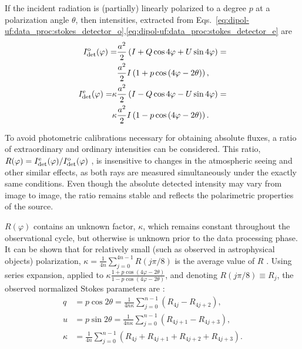 If the incident radiation is (partially) linearly polarized to a degree $p$ at a polarization angle $\theta$, then intensities, extracted from Eqs.~\ref{eq:dipol-uf:data_proc:stokes_detector_o},\ref{eq:dipol-uf:data_proc:stokes_detector_e} are
\begin{equation}
    \begin{aligned}
        \begin{aligned}
            I_{\mathrm{det}}^{\mathrm{o}}(\varphi) =& \frac{a^2}{2}\left(I + Q\cos4\varphi + U\sin4\varphi\right) = \\
            &\frac{a^2}{2} I \left(1 + p\cos\left(4\varphi - 2\theta\right)\right),
        \end{aligned}\\
        \begin{aligned}
            I_{\mathrm{det}}^{\mathrm{e}}(\varphi) =& \kappa\frac{a^2}{2}\left(I - Q\cos4\varphi - U\sin4\varphi\right) = \\
            &\kappa\frac{a^2}{2} I \left(1 - p\cos\left(4\varphi - 2\theta\right)\right). 
        \end{aligned}
    \end{aligned}
\end{equation}

To avoid photometric calibrations necessary for obtaining absolute fluxes, a ratio of extraordinary and ordinary intensities can be considered.
This ratio, $R(\varphi) = I_{\mathrm{det}}^{\mathrm{e}}(\varphi)/I_{\mathrm{det}}^{\mathrm{o}}(\varphi)$ \citep{Clarke1971}, is insensitive to changes in the atmospheric seeing and other similar effects, as both rays are measured simultaneously under the exactly same conditions.
Even though the absolute detected intensity may vary from image to image, the ratio remains stable and reflects the polarimetric properties of the source.


$R(\varphi)$ contains an unknown factor, $\kappa$, which remains constant throughout the observational cycle, but otherwise is unknown prior to the data processing phase.
It can be shown that for relatively small (such as observed in astrophysical objects) polarization, $\kappa = \frac{1}{4n}\sum_{j = 0} ^ {4n - 1} R(j \pi/8 )$ is the average value of $R$ \citep[see, e.g.,][]{Piirola_Thesis}.
Using series expansion, applied to $\kappa \frac{1 + p\cos\left(4\varphi - 2\theta\right)}{1 - p\cos\left(4\varphi - 2\theta\right)}$, and denoting $R(j \pi /8) \equiv R_j$, the observed normalized Stokes parameters are \citep{Piirola_Thesis}:
\begin{equation}
    \begin{aligned}
        q &= p\cos2\theta = \frac{1}{4n\kappa}\sum_{j = 0}^{n - 1} \left(R_{4j} - R_{4j + 2}\right),\\
        u &= p\sin2\theta = \frac{1}{4n\kappa}\sum_{j = 0}^{n - 1} \left(R_{4j + 1} - R_{4j + 3}\right), \\
        \kappa &= \frac{1}{4n}\sum_{j = 0}^{n - 1} \left(R_{4j} + R_{4j + 1} + R_{4j + 2} + R_{4j + 3}\right).
    \end{aligned}
\end{equation}

